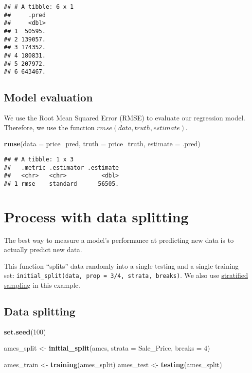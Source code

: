 \documentclass[
]{book}
\newenvironment{Shaded}{\begin{snugshade}}{\end{snugshade}}
\newcommand{\DataTypeTok}[1]{\textcolor[rgb]{0.13,0.29,0.53}{#1}}
\newcommand{\DecValTok}[1]{\textcolor[rgb]{0.00,0.00,0.81}{#1}}
\newcommand{\KeywordTok}[1]{\textcolor[rgb]{0.13,0.29,0.53}{\textbf{#1}}}
\newcommand{\NormalTok}[1]{#1}
\newcommand{\StringTok}[1]{\textcolor[rgb]{0.31,0.60,0.02}{#1}}
\begin{document}
\begin{verbatim}
## # A tibble: 6 x 1
##     .pred
##     <dbl>
## 1  50595.
## 2 139057.
## 3 174352.
## 4 180831.
## 5 207972.
## 6 643467.
\end{verbatim}

\hypertarget{model-evaluation}{%
\section{Model evaluation}\label{model-evaluation}}

We use the Root Mean Squared Error (RMSE) to evaluate our regression model. Therefore, we use the function \(rmse(data, truth, estimate)\).

\begin{Shaded}
\begin{Highlighting}[]
\KeywordTok{rmse}\NormalTok{(}\DataTypeTok{data =}\NormalTok{ price\_pred, }
     \DataTypeTok{truth =}\NormalTok{ price\_truth, }
     \DataTypeTok{estimate =}\NormalTok{ .pred)}
\end{Highlighting}
\end{Shaded}

\begin{verbatim}
## # A tibble: 1 x 3
##   .metric .estimator .estimate
##   <chr>   <chr>          <dbl>
## 1 rmse    standard      56505.
\end{verbatim}

\hypertarget{process-with-data-splitting}{%
\chapter{Process with data splitting}\label{process-with-data-splitting}}

The best way to measure a model's performance at predicting new data is to actually predict new data.

This function ``splits'' data randomly into a single testing and a single training set: \texttt{initial\_split(data,\ prop\ =\ 3/4,\ strata,\ breaks)}. We also use \href{https://en.wikipedia.org/wiki/Stratified_sampling}{stratified sampling} in this example.

\hypertarget{data-splitting}{%
\section{Data splitting}\label{data-splitting}}

\begin{Shaded}
\begin{Highlighting}[]
\KeywordTok{set.seed}\NormalTok{(}\DecValTok{100}\NormalTok{) }

\NormalTok{ames\_split \textless{}{-}}\StringTok{  }\KeywordTok{initial\_split}\NormalTok{(ames,}
                             \DataTypeTok{strata =}\NormalTok{ Sale\_Price,}
                             \DataTypeTok{breaks =} \DecValTok{4}\NormalTok{)}

\NormalTok{ames\_train \textless{}{-}}\StringTok{  }\KeywordTok{training}\NormalTok{(ames\_split)}
\NormalTok{ames\_test \textless{}{-}}\StringTok{ }\KeywordTok{testing}\NormalTok{(ames\_split)}
\end{Highlighting}
\end{Shaded}
\end{document}
